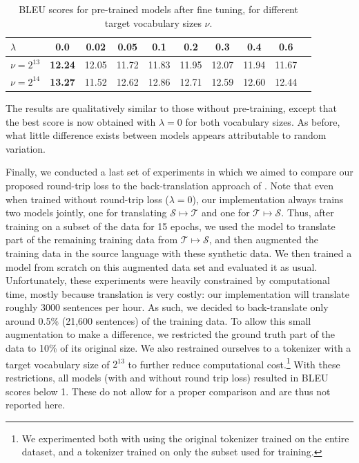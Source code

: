 \documentclass[11pt,a4paper]{article}
\begin{document}
\begin{table} [ht]
\centering
\small
\begin{tabular}{ l || c | c | c | c | c | c | c | c | c  }
  $\lambda$ & 0.0 & 0.02 & 0.05 & 0.1 & 0.2 & 0.3 & 0.4 & 0.6 \\ \hline
  $\nu=2^{13}$ & \textbf{12.24} & 12.05 & 11.72 & 11.83 & 11.95 & 12.07 & 11.94 & 11.67 \\
  $\nu=2^{14}$ & \textbf{13.27} & 11.52 & 12.62 & 12.86 & 12.71 & 12.59 & 12.60 & 12.44 \\
\end{tabular}
\caption{BLEU scores for pre-trained models after fine tuning, for different target vocabulary sizes $\nu$.}
\label{tab:result2}
\end{table}

The results are qualitatively similar to those without pre-training, except that the best score is now obtained with $\lambda=0$ for both vocabulary sizes. As before, what little difference exists between models appears attributable to random variation.

Finally, we conducted a last set of experiments in which we aimed to compare our proposed round-trip loss to the back-translation approach of \citet{backtrans}. Note that even when trained without round-trip loss ($\lambda=0$), our implementation always trains two models jointly, one for translating $\mathcal{S}\mapsto\mathcal{T}$ and one for $\mathcal{T}\mapsto\mathcal{S}$. Thus, after training on a subset of the data for 15 epochs, we used the model to translate part of the remaining training data from $\mathcal{T}\mapsto\mathcal{S}$, and then augmented the training data in the source language with these synthetic data. We then trained a model from scratch on this augmented data set and evaluated it as usual. Unfortunately, these experiments were heavily constrained by computational time, mostly because translation is very costly: our implementation will translate roughly 3000 sentences per hour. As such, we decided to back-translate only around 0.5\% (21,600 sentences) of the training data. To allow this small augmentation to make a difference, we restricted the ground truth part of the data to 10\% of its original size. We also restrained ourselves to a tokenizer with a target vocabulary size of  $2^{13}$ to further reduce computational cost.\footnote{We experimented both with using the original tokenizer trained on the entire dataset, and a tokenizer trained on only the subset used for training.} With these restrictions, all models (with and without round trip loss)  resulted in BLEU scores below 1. These do not allow for a proper comparison and are thus not reported here.
\end{document}
